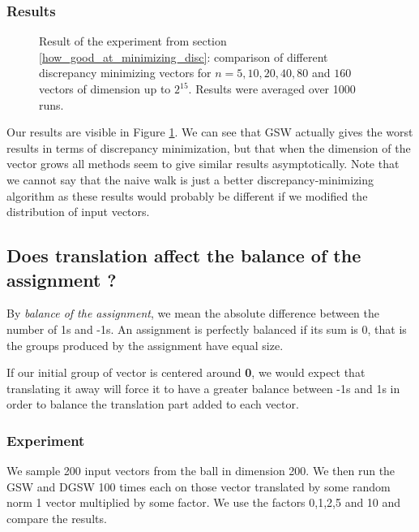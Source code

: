 \documentclass[12pt]{article}
\begin{document}
\subsubsection{Results}
\begin{figure}
\centering

\caption{Result of the experiment from section \ref{how_good_at_minimizing_disc}: comparison of different discrepancy minimizing vectors for $n=5,10,20,40,80$ and $160$ vectors of dimension up to $2^{15}$. Results were averaged over 1000 runs.}\label{output_disc}
\end{figure}
Our results are visible in Figure \ref{output_disc}. We can see that GSW actually gives the worst results in terms of discrepancy minimization, but that when the dimension of the vector grows all methods seem to give similar results asymptotically. Note that we cannot say that the naive walk is just a better discrepancy-minimizing algorithm as these results would probably be different if we modified the distribution of input vectors.

\subsection{Does translation affect the balance of the assignment ?}\label{trans_balance}
By \textit{balance of the assignment}, we mean the absolute difference between the number of 1s and -1s. An assignment is perfectly balanced if its sum is 0, that is the groups produced by the assignment have equal size.

If our initial group of vector is centered around \textbf{0}, we would expect that translating it away will force it to have a greater balance between -1s and 1s in order to balance the translation part added to each vector.

\subsubsection{Experiment}
We sample 200 input vectors from the ball in dimension 200. We then run the GSW and DGSW 100 times each on those vector translated by some random norm 1 vector multiplied by some factor. We use the factors 0,1,2,5 and 10 and compare the results.
\end{document}
